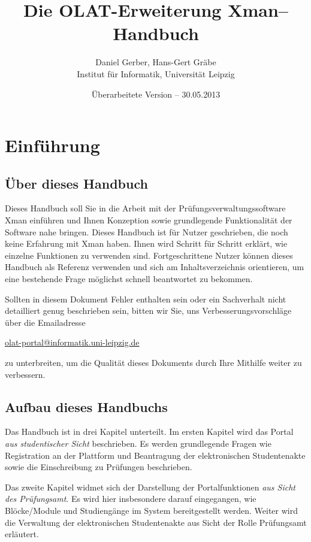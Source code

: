 \documentclass[a4paper,11pt]{article}
\author{Daniel Gerber, Hans-Gert Gräbe\\ 
Institut für Informatik, Universität Leipzig}
\title{Die OLAT-Erweiterung Xman-- Handbuch}
\date{Überarbeitete Version -- 30.05.2013}
\begin{document}
\maketitle

\tableofcontents

\section*{Einführung}

\subsection*{Über dieses Handbuch}

Dieses Handbuch soll Sie in die Arbeit mit der Prüfungsverwaltungssoftware
Xman einführen und Ihnen Konzeption sowie grundlegende Funktionalität der
Software nahe bringen. Dieses Handbuch ist für Nutzer geschrieben, die noch
keine Erfahrung mit Xman haben. Ihnen wird Schritt für Schritt erklärt, wie
einzelne Funktionen zu verwenden sind.  Fortgeschrittene Nutzer können dieses
Handbuch als Referenz verwenden und sich am Inhaltsverzeichnis orientieren, um
eine bestehende Frage möglichst schnell beantwortet zu bekommen.

Sollten in diesem Dokument Fehler enthalten sein oder ein Sachverhalt nicht
detailliert genug beschrieben sein, bitten wir Sie, uns
Verbesserungsvorschläge über die Emailadresse
\begin{center}
  \url{olat-portal@informatik.uni-leipzig.de} 
\end{center}
zu unterbreiten, um die Qualität dieses Dokuments durch Ihre Mithilfe weiter
zu verbessern.

\subsection*{Aufbau dieses Handbuchs}

Das Handbuch ist in drei Kapitel unterteilt. Im ersten Kapitel wird das Portal
{\em aus studentischer Sicht} beschrieben. Es werden
grundlegende Fragen wie Registration an der Plattform und Beantragung der
elektronischen Studentenakte sowie die Einschreibung zu Prüfungen beschrieben.

Das zweite Kapitel widmet sich der Darstellung der Portalfunktionen {\em aus
Sicht des Prüfungsamt}. Es wird hier insbesondere darauf eingegangen,
wie Blöcke/Module und Studiengänge im System bereitgestellt werden.  Weiter
wird die Verwaltung der elektronischen Studentenakte aus Sicht der Rolle
Prüfungsamt erläutert.
\end{document}
